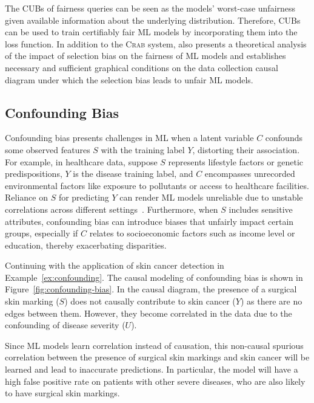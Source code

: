 \documentclass[11pt]{article}
\newcommand{\crab}{\textsc{Crab}\xspace}
\begin{document}
The CUBs of fairness queries can be seen as the models' worst-case unfairness given available information about the underlying distribution. Therefore, CUBs can be used to train certifiably fair ML models by incorporating them into the loss function. In addition to the \crab system, \cite{zhu2023consistent} also presents a theoretical analysis of the impact of selection bias on the fairness of ML models and establishes necessary and sufficient graphical conditions on the data collection causal diagram under which the selection bias leads to unfair ML models.


\subsection{Confounding Bias}
Confounding bias presents challenges in ML when a latent variable \(C\) confounds some observed features \(S\) with the training label \(Y\), distorting their association. For example, in healthcare data, suppose \(S\) represents lifestyle factors or genetic predispositions, \(Y\) is the disease training label, and \(C\) encompasses unrecorded environmental factors like exposure to pollutants or access to healthcare facilities. Reliance on \(S\) for predicting \(Y\) can render ML models unreliable due to unstable correlations across different settings~\cite{zhang2021deep}. Furthermore, when \(S\) includes sensitive attributes, confounding bias can introduce biases that unfairly impact certain groups, especially if \(C\) relates to socioeconomic factors such as income level or education, thereby exacerbating disparities.

\vspace{-0.3cm}
\begin{example}\label{ex:causal-confounding}
Continuing with the application of skin cancer detection in Example~\ref{ex:confounding}. The causal modeling of confounding bias is shown in Figure~\ref{fig:confounding-bias}.
In the causal diagram, the presence of a surgical skin marking ($S$) does not causally contribute to skin cancer ($Y$) as there are no edges between them. However, they become correlated in the data due to the confounding of disease severity ($U$). 

Since ML models learn correlation instead of causation, this non-causal spurious correlation between the presence of surgical skin markings and skin cancer will be learned and lead to inaccurate predictions. In particular, the model will have a high false positive rate on patients with other severe diseases, who are also likely to have surgical skin markings.
\end{example}
\end{document}
